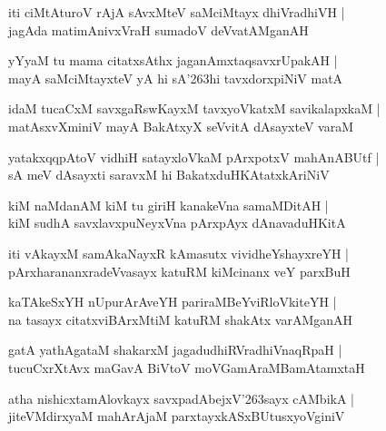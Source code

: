 \documentclass[twoside,12pt,openright]{book}
\def\S{\char'263}
\newcounter{shloka}[chapter]
\begin{document}
\begin{shloka}%
iti ciMtAturoV rAjA sAvxMteV saMciMtayx dhiVradhiVH |\\
jagAda matimAnivxVraH sumadoV deVvatAMganAH 
\end{shloka}

\begin{shloka}%
yYyaM tu mama citatxsAthx jaganAmxtaqsavxrUpakAH |\\
mayA saMciMtayxteV yA hi sA\S hi tavxdorxpiNiV matA 
\end{shloka}

\begin{shloka}%
idaM tucaCxM savxgaRswKayxM tavxyoVkatxM savikalapxkaM |\\
matAsxvXminiV mayA BakAtxyX seVvitA dAsayxteV varaM 
\end{shloka}

\begin{shloka}%
yatakxqqpAtoV vidhiH satayxloVkaM pArxpotxV mahAnABUtf |\\
sA meV dAsayxti saravxM hi BakatxduHKAtatxkAriNiV 
\end{shloka}

\begin{shloka}%
kiM naMdanAM kiM tu giriH kanakeVna samaMDitAH |\\
kiM sudhA savxlavxpuNeyxVna pArxpAyx dAnavaduHKitA 
\end{shloka}

\begin{shloka}%
iti vAkayxM samAkaNayxR kAmasutx vividheYshayxreYH |\\
pArxharananxradeVvasayx katuRM kiMcinanx veY parxBuH
\end{shloka}

\begin{shloka}%
kaTAkeSxYH nUpurArAveYH pariraMBeYviRloVkiteYH |\\
na tasayx citatxviBArxMtiM katuRM shakAtx varAMganAH 
\end{shloka}

\begin{shloka}%
gatA yathAgataM shakarxM jagadudhiRVradhiVnaqRpaH |\\
tucuCxrXtAvx maGavA BiVtoV moVGamAraMBamAtamxtaH 
\end{shloka}

\begin{shloka}%
atha nishicxtamAlovkayx savxpadAbejxV\S sayx cAMbikA |\\
jiteVMdirxyaM mahArAjaM parxtayxkASxBUtusxyoVginiV  
\end{shloka}
\end{document}

